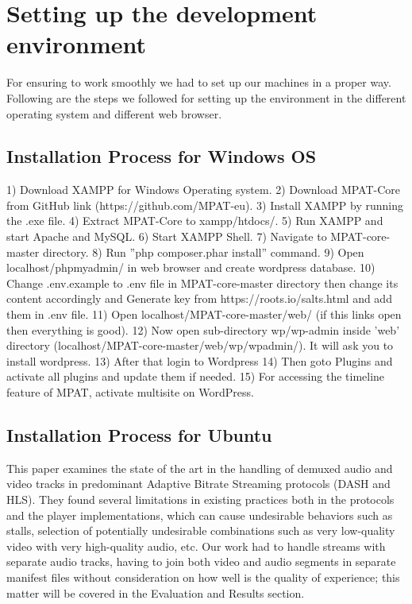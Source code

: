 \section{\textbf{Setting up the development environment }}\label{sec:relatedwork}


For ensuring to work smoothly we had to set up our
machines in a proper way. Following are the steps we followed
for setting up the environment in the different operating system
and different web browser.


\subsection{Installation Process for Windows OS}
 
 
 1) Download XAMPP for Windows Operating system.
2) Download MPAT-Core from GitHub link
(https://github.com/MPAT-eu).
3) Install XAMPP by running the .exe file.
4) Extract MPAT-Core to xampp/htdocs/.
5) Run XAMPP and start Apache and MySQL.
6) Start XAMPP Shell.
7) Navigate to MPAT-core-master directory.
8) Run ”php composer.phar install” command.
9) Open localhost/phpmyadmin/ in web browser and create
wordpress database.
10) Change .env.example to .env file in MPAT-core-master
directory then change its content accordingly and Generate
key from https://roots.io/salts.html and add them
in .env file.
11) Open localhost/MPAT-core-master/web/ (if this links
open then everything is good).
12) Now open sub-directory wp/wp-admin inside ’web’
directory (localhost/MPAT-core-master/web/wp/wpadmin/).
It will ask you to install wordpress.
13) After that login to Wordpress
14) Then goto Plugins and activate all plugins and update
them if needed.
15) For accessing the timeline feature of MPAT, activate
multisite on WordPress.
 
  
 
\subsection{Installation Process for Ubuntu}

This paper \cite{measures} examines the state of the art in the handling of demuxed audio and video tracks in predominant Adaptive Bitrate Streaming protocols (DASH and HLS). They found several limitations in existing practices both in the protocols and the player implementations, which can cause undesirable behaviors such as stalls, selection of potentially undesirable combinations such as very low-quality video with very high-quality audio, etc. Our work had to handle streams with separate audio tracks, having to join both video and audio segments in separate manifest files without consideration on how well is the quality of experience; this matter will be covered in the Evaluation and Results section.

